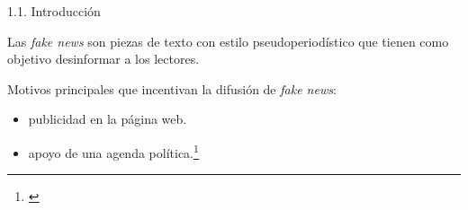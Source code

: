 \begin{frame}{1.1. Introducción}

Las \textit{fake news} son piezas de texto con estilo pseudoperiodístico que tienen como objetivo desinformar a los lectores.



\vspace{2ex}

Motivos principales que incentivan la difusión de \textit{fake news}:
\begin{itemize}
    \item \underline{} publicidad en la página web.
    \item \underline{} apoyo de una agenda política.\footnote{\citep{AlcottGentzkow2017, Sydell2016}}
\end{itemize}

\end{frame}

